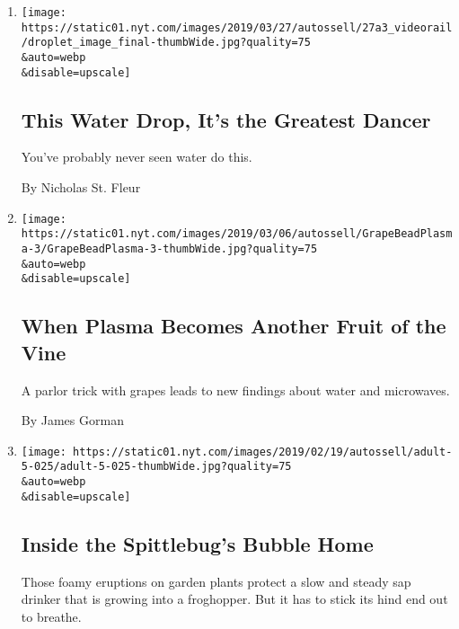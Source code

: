 \begin{enumerate}
\def\labelenumi{\arabic{enumi}.}
\item
  \href{/2019/03/26/science/water-droplets-dance.html}{}

  \texttt{[image: https://static01.nyt.com/images/2019/03/27/autossell/27a3\_videorail/droplet\_image\_final-thumbWide.jpg?quality=75\\\&auto=webp\\\&disable=upscale]}

  \hypertarget{this-water-drop-its-the-greatest-dancer}{%
  \subsection{This Water Drop, It's the Greatest
  Dancer}\label{this-water-drop-its-the-greatest-dancer}}

  You've probably never seen water do this.

  By Nicholas St. Fleur
\item
  \href{/2019/03/05/science/microwave-grapes-plasma.html}{}

  \texttt{[image: https://static01.nyt.com/images/2019/03/06/autossell/GrapeBeadPlasma-3/GrapeBeadPlasma-3-thumbWide.jpg?quality=75\\\&auto=webp\\\&disable=upscale]}

  \hypertarget{when-plasma-becomes-another-fruit-of-the-vine}{%
  \subsection{When Plasma Becomes Another Fruit of the
  Vine}\label{when-plasma-becomes-another-fruit-of-the-vine}}

  A parlor trick with grapes leads to new findings about water and
  microwaves.

  By James Gorman
\item
  \href{/2019/02/19/science/spittlebugs-bubble-home.html}{}

  \texttt{[image: https://static01.nyt.com/images/2019/02/19/autossell/adult-5-025/adult-5-025-thumbWide.jpg?quality=75\\\&auto=webp\\\&disable=upscale]}

  \hypertarget{inside-the-spittlebugs-bubble-home}{%
  \subsection{Inside the Spittlebug's Bubble
  Home}\label{inside-the-spittlebugs-bubble-home}}

  Those foamy eruptions on garden plants protect a slow and steady sap
  drinker that is growing into a froghopper. But it has to stick its
  hind end out to breathe.


\end{enumerate}
